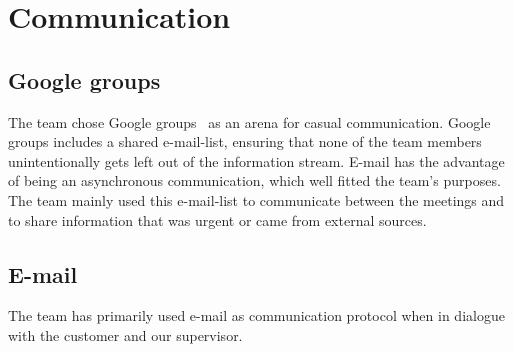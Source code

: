 \section{Communication}
\subsection{Google groups}
The team chose Google groups~\cite{ggroups} as an arena for casual communication. Google groups includes a shared e-mail-list, ensuring that none of the team members unintentionally gets left out of the information stream. E-mail has the advantage of being an asynchronous communication, which well fitted the team's purposes. The team mainly used this e-mail-list to communicate between the meetings and to share information that was urgent or came from external sources. 

\subsection{E-mail}
The team has primarily used e-mail as communication protocol when in dialogue with the customer and our supervisor.